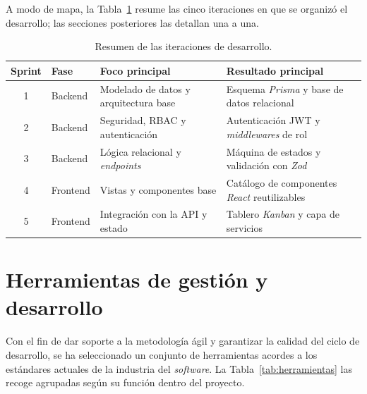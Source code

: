 \documentclass[11pt,oneside,spanish,listoffigures,listoftables]{tfgetsinf}
\begin{document}
A modo de mapa, la Tabla~\ref{tab:sprints} resume las cinco iteraciones en que se organizó el desarrollo; las secciones posteriores las detallan una a una.

\begin{table}[ht]
\centering
\caption[Resumen de las iteraciones de desarrollo]{Resumen de las iteraciones de desarrollo.}
\label{tab:sprints}
\footnotesize
\renewcommand{\arraystretch}{1.3}
\begin{tabularx}{\textwidth}{%
  c l%
  >{\raggedright\arraybackslash}X%
  >{\raggedright\arraybackslash}X}
\toprule
\textbf{Sprint} & \textbf{Fase} & \textbf{Foco principal} & \textbf{Resultado principal} \\
\midrule
1 & Backend & Modelado de datos y arquitectura base & Esquema \mbox{\textit{Prisma}} y base de datos relacional \\
2 & Backend & Seguridad, RBAC y autenticación & Autenticación JWT y \textit{middlewares} de rol \\
3 & Backend & Lógica relacional y \textit{endpoints} & Máquina de estados y validación con \mbox{\textit{Zod}} \\
4 & Frontend & Vistas y componentes base & Catálogo de componentes \mbox{\textit{React}} reutilizables \\
5 & Frontend & Integración con la API y estado & Tablero \textit{Kanban} y capa de servicios \\
\bottomrule
\end{tabularx}
\end{table}

\section{Herramientas de gestión y desarrollo}

Con el fin de dar soporte a la metodología ágil y garantizar la calidad del ciclo de desarrollo, se ha seleccionado un conjunto de herramientas acordes a los estándares actuales de la industria del \textit{software}. La Tabla~\ref{tab:herramientas} las recoge agrupadas según su función dentro del proyecto.
\end{document}

